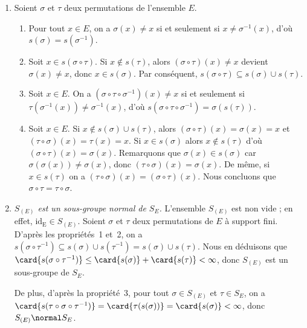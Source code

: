 \begin{enumerate}
  \item %
    Soient $\sigma$ et $\tau$ deux permutations de l'ensemble $E$.
    \begin{enumerate}[1)]
      \item %
        Pour tout $x\in E$, on a $\sigma(x)\neq x$ si et seulement si $x\neq \sigma^{-1}(x)$, d'où $s(\sigma) = s(\sigma^{-1})$.

      \item %
        Soit $x\in s(\sigma\circ\tau)$. Si $x\notin s(\tau)$, alors $(\sigma\circ\tau)(x) \neq x$ devient $\sigma(x)\neq x$, donc $x\in s(\sigma)$. 
        Par conséquent, $s(\sigma\circ\tau)\subseteq s(\sigma)\cup s(\tau)$.

      \item %
        Soit $x\in E$.
        On a $(\sigma\circ\tau\circ\sigma^{-1})(x) \neq x$ si et seulement si $\tau(\sigma^{-1}(x)) \neq \sigma^{-1}(x)$, d'où $s(\sigma\circ\tau\circ\sigma^{-1}) = \sigma(s(\tau))$.

      \item %
        Soit $x\in E$. 
        Si $x\notin s(\sigma)\cup s(\tau)$, alors $(\sigma\circ\tau)(x) = \sigma(x) = x$ et $(\tau\circ\sigma)(x) = \tau(x) = x$.
        Si $x\in s(\sigma)$ alors $x\notin s(\tau)$ d'où $(\sigma\circ\tau)(x) = \sigma(x)$.
        Remarquons que $\sigma(x)\in s(\sigma)$ car $\sigma(\sigma(x)) \neq \sigma(x)$, donc $(\tau\circ\sigma)(x) = \sigma(x)$.
        De même, si $x\in s(\tau)$ on a $(\tau\circ\sigma)(x) = (\sigma\circ\tau)(x)$.  
        Nous concluons que $\sigma\circ\tau = \tau\circ\sigma$.
    \end{enumerate}

  \item %
    \emph{$S_{(E)}$ est un sous-groupe normal de $S_E$.}
    L'ensemble $S_{(E)}$ est non vide ; en effet, $\mathrm{id_E}\in S_{(E)}$.
    Soient $\sigma$ et $\tau$ deux permutations de $E$ à support fini.
    D'après les propriétés~1 et~2, on a $s(\sigma\circ\tau^{-1})\subseteq s(\sigma)\cup s(\tau^{-1})=s(\sigma)\cup s(\tau)$. 
    Nous en déduisons que $\card{s(\sigma\circ\tau^{-1})}\leq \card{s(\sigma)}+\card{s(\tau)} < \infty$, donc $S_{(E)}$ est un sous-groupe de $S_E$.  
    
    De plus, d'après la propriété~3, pour tout $\sigma\in S_{(E)}$ et $\tau\in S_E$, on a $\card{s(\tau\circ\sigma\circ\tau^{-1})} = \card{\tau(s(\sigma))} = \card{s(\sigma)} < \infty$, donc $S_{(E)}\normal S_E$.


\end{enumerate}
